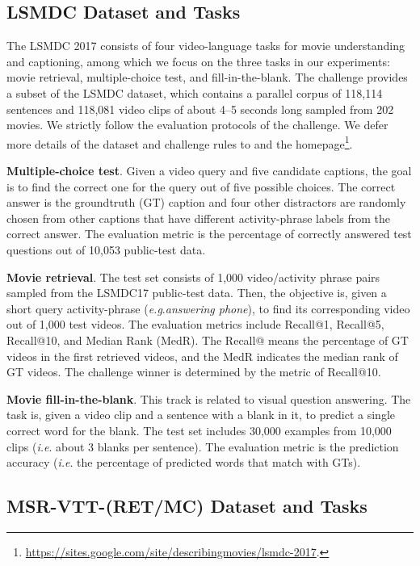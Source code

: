 \documentclass[runningheads]{llncs}
\makeatletter
\DeclareRobustCommand\onedot{\futurelet\@let@token\@onedot}
\def\onedot{.\@\xspace}
\def\eg{\textit{e.g}\onedot} \def\Eg{\textit{E.g}\onedot}
\def\ie{\textit{i.e}\onedot} \def\Ie{\textit{I.e}\onedot}
\makeatother
\begin{document}
\subsection{LSMDC Dataset and Tasks}
\label{sec:lsmdc_intro}



The LSMDC 2017 consists of four video-language tasks for movie understanding and captioning, 
among which we focus on the three tasks in our experiments: movie retrieval, multiple-choice test, and fill-in-the-blank.
The challenge provides a subset of the LSMDC dataset, which contains a parallel corpus of 118,114 sentences and 118,081 video clips of about 4--5 seconds long sampled from 202 movies.
We strictly follow the evaluation protocols of the challenge.
We defer more details of the dataset and challenge rules to \cite{rohrbach-arxiv-2016} and the homepage\footnote{\url{https://sites.google.com/site/describingmovies/lsmdc-2017}.}.


\textbf{Multiple-choice test}. Given a video query and five candidate captions, the goal is to find the correct one for the query out of five possible choices.
The correct answer is the groundtruth (GT) caption and four other distractors are randomly chosen from other captions that have different activity-phrase labels from the correct answer.
The evaluation metric is the percentage of correctly answered test questions out of 10,053 public-test data.

\textbf{Movie retrieval}. 
The test set consists of 1,000 video/activity phrase pairs sampled from the LSMDC17 public-test data.
Then, the objective is, given a short query activity-phrase (\eg \textit{answering phone}), to find its corresponding video out of 1,000 test videos.
The evaluation metrics include Recall@1, Recall@5, Recall@10, and Median Rank (MedR).
The Recall@ means the percentage of GT videos in the first  retrieved videos,
and the MedR indicates the median rank of GT videos.
The challenge winner is determined by the metric of Recall@10.




\textbf{Movie fill-in-the-blank}. 
This track is related to visual question answering.
The task is, given a video clip and a sentence with a blank in it, to predict a single correct word for the blank.
The test set includes 30,000 examples from 10,000 clips (\ie about 3 blanks per sentence).
The evaluation metric is the prediction accuracy (\ie the percentage of predicted words that match with GTs).

\subsection{MSR-VTT-(RET/MC) Dataset and Tasks}
\label{sec:msrvtt_intro}
\end{document}
